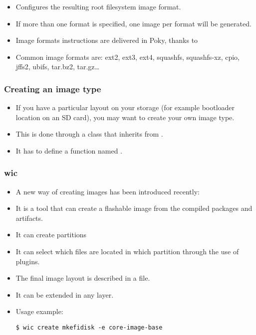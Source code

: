 \begin{frame}
  \frametitle{}
  \begin{itemize}
    \item Configures the resulting root filesystem image format.
    \item If more than one format is specified, one image per format
      will be generated.
    \item Image formats instructions are delivered in Poky, thanks to
    \item Common image formats are: ext2, ext3, ext4, squashfs,
      squashfs-xz, cpio, jffs2, ubifs, tar.bz2, tar.gz\dots
  \end{itemize}
\end{frame}

\begin{frame}
  \frametitle{Creating an image type}
  \begin{itemize}
    \item If you have a particular layout on your storage (for example
      bootloader location on an SD card), you may want to create your
      own image type.
    \item This is done through a class that inherits from
      .
    \item It has to define a function named .
  \end{itemize}
\end{frame}

\begin{frame}[fragile]
  \frametitle{wic}
  \begin{itemize}
    \item A new way of creating images has been introduced recently:
    \item It is a tool that can create a flashable image from the
      compiled packages and artifacts.
    \item It can create partitions
    \item It can select which files are located in
      which partition through the use of plugins.
    \item The final image layout is described in a  file.
    \item It can be extended in any layer.
    \item Usage example:
      \begin{block}{}
        \begin{verbatim}
$ wic create mkefidisk -e core-image-base
        \end{verbatim}
      \end{block}
  \end{itemize}
\end{frame}

